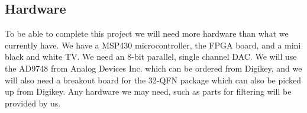 \subsection{Hardware}

To be able to complete this project we will need more hardware than what we 
currently have. We have a MSP430 microcontroller, the FPGA board, and a mini
black and white TV. We need an 8-bit parallel, single channel DAC. We will use
the AD9748 from Analog Devices Inc. which can be ordered from Digikey, and we
will also need a breakout board for the 32-QFN package which can also be picked
up from Digikey. Any hardware we may need, such as parts for filtering will be
provided by us.

